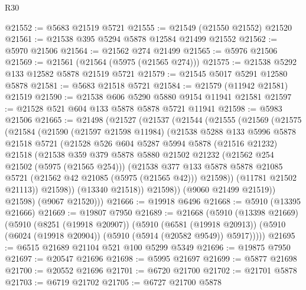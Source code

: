 \begin{lexlean}{R30}
\begin{coremodule}
@21552 := @5683 @21519 @5721
@21555 := @21549 (@21550 @21552) @21520
@21561 := @21538 @395 @5294 @5878 @12584 @21499 @21552
@21562 := @5970 @21506
@21564 := @21562 @274 @21499
@21565 := @5976 @21506
@21569 := @21561 (@21564 (@5975 (@21565 @274)))
@21575 := @21538 @5292 @133 @12582 @5878 @21519 @5721
@21579 := @21545 @5017 @5291 @12580 @5878
@21581 := @5683 @21518 @5721
@21584 := @21579 (@11942 @21581) @21519
@21590 := @21538 @606 @5290 @5880 @9154 @11941 @21581
@21597 := @21528 @521 @604 @133 @5878 @5878 @5721 @11941
@21598 := @5983 @21506
@21665 := @21498
    (@21527
      (@21537
        (@21544
          (@21555
            (@21569
              (@21575
                (@21584
                  (@21590
                    (@21597 @21598 @11984)
                    (@21538
                      @5288
                      @133
                      @5996
                      @5878
                      @21518
                      @5721
                      (@21528
                        @526
                        @604
                        @5287
                        @5994
                        @5878
                        (@21516 @21232)
                        @21518
                        (@21538
                          @359
                          @379
                          @5878
                          @5880
                          @21502
                          @21232
                          (@21562 @254 @21502 (@5975 (@21565 @254)))
                          (@21538
                            @377
                            @133
                            @5878
                            @5878
                            @21085
                            @5721
                            (@21562 @42 @21085 (@5975 (@21565 @42)))
                            @21598))
                        (@11781 @21502 @21113))
                      @21598))
                  (@13340 @21518))
                @21598))
            (@9060 @21499 @21519))
          @21598)
        (@9067 @21520)))
@21666 := @19918 @6496
@21668 := @5910 (@13395 @21666)
@21669 := @19807 @7950
@21689 := @21668
    (@5910
      (@13398 @21669)
      (@5910
        (@8251 (@19918 @20907))
        (@5910
          (@6581 (@19918 @20913))
          (@5910 (@6024 (@19918 @20904)) (@5910 (@5914 (@20582 @9549)) @5917)))))
@21695 := @6515 @21689 @21104 @521 @100 @5299 @5349
@21696 := @19875 @7950
@21697 := @20547 @21696
@21698 := @5995 @21697
@21699 := @5877 @21698
@21700 := @20552 @21696
@21701 := @6720 @21700
@21702 := @21701 @5878
@21703 := @6719 @21702
@21705 := @6727 @21700 @5878

\end{coremodule}
\end{lexlean}
